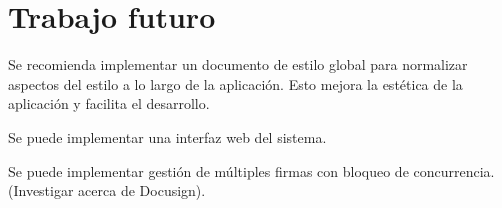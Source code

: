 \section{Trabajo futuro}

Se recomienda implementar un documento de estilo global para normalizar aspectos del estilo a lo largo de la aplicación. Esto mejora la estética de la aplicación y facilita el desarrollo.

Se puede implementar una interfaz web del sistema.

Se puede implementar gestión de múltiples firmas con bloqueo de concurrencia. (Investigar acerca de Docusign).


%
%
